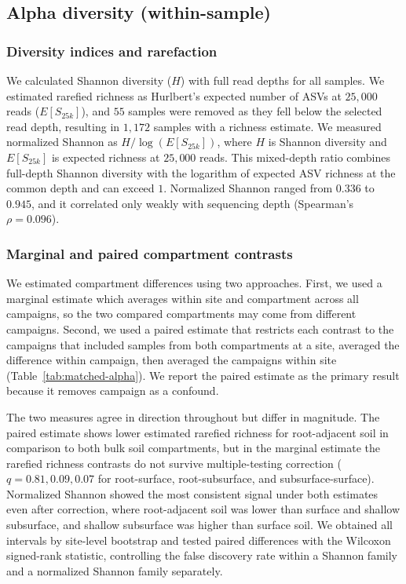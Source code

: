 \documentclass[11pt]{article}
\begin{document}


\subsection{Alpha diversity (within-sample)}\label{sup:alphadiversity}
\subsubsection{Diversity indices and rarefaction}\label{sup:alphadiversity_indices}
We calculated Shannon diversity ($H$) with full read depths for all samples. We estimated rarefied richness as Hurlbert's expected number of ASVs at $25{,}000$ reads ($E[S_{25k}]$), and $55$ samples were removed as they fell below the selected read depth, resulting in $1{,}172$ samples with a richness estimate. We measured normalized Shannon as $H/\log(E[S_{25k}])$, where $H$ is Shannon diversity and $E[S_{25k}]$ is expected richness at $25{,}000$ reads. This mixed-depth ratio combines full-depth Shannon diversity with the logarithm of expected ASV richness at the common depth and can exceed $1$. Normalized Shannon ranged from $0.336$ to $0.945$, and it correlated only weakly with sequencing depth (Spearman's $\rho = 0.096$).

\subsubsection{Marginal and paired compartment contrasts}\label{sup:alphadiversity_compartments}
We estimated compartment differences using two approaches. First, we used a marginal estimate which averages within site and compartment across all campaigns, so the two compared compartments may come from different campaigns. Second, we used a paired estimate that restricts each contrast to the campaigns that included samples from both compartments at a site, averaged the difference within campaign, then averaged the campaigns within site (Table~\ref{tab:matched-alpha}). We report the paired estimate as the primary result because it removes campaign as a confound.

The two measures agree in direction throughout but differ in magnitude. The paired estimate shows lower estimated rarefied richness for root-adjacent soil in comparison to both bulk soil compartments, but in the marginal estimate the rarefied richness contrasts do not survive multiple-testing correction ($q = 0.81, 0.09, 0.07$ for root-surface, root-subsurface, and subsurface-surface). Normalized Shannon showed the most consistent signal under both estimates even after correction, where root-adjacent soil was lower than surface and shallow subsurface, and shallow subsurface was higher than surface soil. We obtained all intervals by site-level bootstrap and tested paired differences with the Wilcoxon signed-rank statistic, controlling the false discovery rate within a Shannon family and a normalized Shannon family separately.

\end{document}
